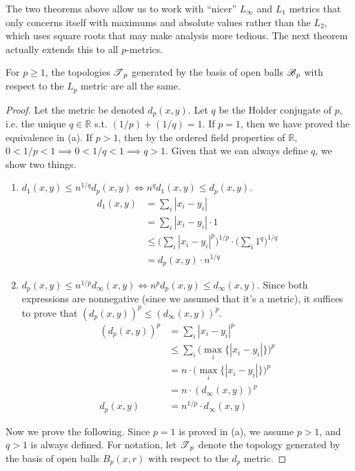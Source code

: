       The two theorems above allow us to work with ``nicer'' $L_\infty$ and $L_1$ metrics that only concerns itself with maximums and absolute values rather than the $L_2$, which uses square roots that may make analysis more tedious. The next theorem actually extends this to all $p$-metrics. 

      \begin{theorem}
        For $p \geq 1$, the topologies $\T_p$ generated by the basis of open balls $\B_p$ with respect to the $L_p$ metric are all the same. 
      \end{theorem}
      \begin{proof}
        Let the metric be denoted $d_p (x, y)$. Let $q$ be the Holder conjugate of $p$, i.e. the unique $q \in \mathbb{R}$ s.t. $(1/p) + (1/q) = 1$. If $p = 1$, then we have proved the equivalence in (a). If $p > 1$, then by the ordered field properties of $\mathbb{R}$, $0 < 1/p < 1 \implies 0 < 1/q < 1 \implies q > 1$. Given that we can always define $q$, we show two things. 
        \begin{enumerate}
          \item $d_1 (x, y) \leq n^{1/q} d_p (x, y) \iff n^q d_1 (x, y) \leq d_p (x, y)$. 
          \begin{align}
            d_1 (x, y) & = \sum_i |x_i - y_i| \\ 
                       & = \sum_i |x_i - y_i| \cdot 1 \\
                       & \leq \bigg( \sum_i |x_i - y_i|^p \bigg)^{1/p} \cdot \bigg(\sum_i 1^q \bigg)^{1/q} \\
                       & = d_p (x, y) \cdot n^{1/q}
          \end{align} 

          \item $d_p (x, y) \leq n^{1/p} d_\infty (x, y) \iff n^p d_p (x, y) \leq d_\infty (x, y)$. Since both expressions are nonnegative (since we assumed that it's a metric), it suffices to prove that $(d_p (x, y))^p \leq (d_\infty (x, y))^{p}$. 
          \begin{align}
            (d_p(x, y))^p & = \sum_i |x_i - y_i|^p \\
                          & \leq \sum_i \big( \max_i \{ |x_i - y_i| \} \big)^p \\
                          & = n \cdot \big( \max_i \{ |x_i - y_i| \} \big)^p \\ 
                          & = n \cdot (d_\infty (x, y))^p \\
            d_p(x, y)     & = n^{1/p} \cdot d_\infty (x, y)
          \end{align}
        \end{enumerate} 
        Now we prove the following. Since $p = 1$ is proved in (a), we assume $p > 1$, and $q > 1$ is always defined. For notation, let $\T_p$ denote the topology generated by the basis of open balls $B_p (x, r)$ with respect to the $d_p$ metric. 


\end{proof}

